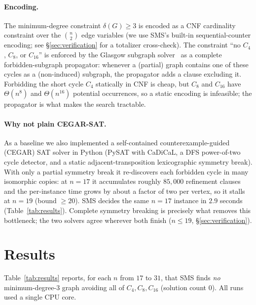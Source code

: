 \documentclass[11pt]{article}
\newcommand{\degmin}{\delta}
\begin{document}
\paragraph{Encoding.} The minimum-degree constraint $\degmin(G) \ge 3$ is encoded
as a CNF cardinality constraint over the $\binom{n}{2}$ edge variables (we use
SMS's built-in sequential-counter encoding; see \S\ref{sec:verification} for a
totalizer cross-check). The constraint ``no $C_4$, $C_8$, or $C_{16}$'' is enforced
by the Glasgow subgraph solver~\cite{glasgow} as a complete forbidden-subgraph
propagator: whenever a (partial) graph contains one of these cycles as a
(non-induced) subgraph, the propagator adds a clause excluding it. Forbidding the
short cycle $C_4$ statically in CNF is cheap, but $C_8$ and $C_{16}$ have
$\Theta(n^8)$ and $\Theta(n^{16})$ potential occurrences, so a static encoding is
infeasible; the propagator is what makes the search tractable.

\paragraph{Why not plain CEGAR-SAT.} As a baseline we also implemented a
self-contained counterexample-guided (CEGAR) SAT solver in Python (PySAT with
CaDiCaL, a DFS power-of-two cycle detector, and a static adjacent-transposition
lexicographic symmetry break). With only a partial symmetry break it re-discovers
each forbidden cycle in many isomorphic copies: at $n=17$ it accumulates roughly
$85{,}000$ refinement clauses and the per-instance time grows by about a factor of
two per vertex, so it stalls at $n=19$ (bound $\ge 20$). SMS decides the same
$n=17$ instance in $2.9$ seconds (Table~\ref{tab:results}). Complete symmetry
breaking is precisely what removes this bottleneck; the two solvers agree wherever
both finish ($n \le 19$, \S\ref{sec:verification}).

\section{Results}
\label{sec:results}

Table~\ref{tab:results} reports, for each $n$ from $17$ to $31$, that SMS finds
\emph{no} minimum-degree-3 graph avoiding all of $C_4, C_8, C_{16}$ (solution count
$0$). All runs used a single CPU core.
\end{document}
